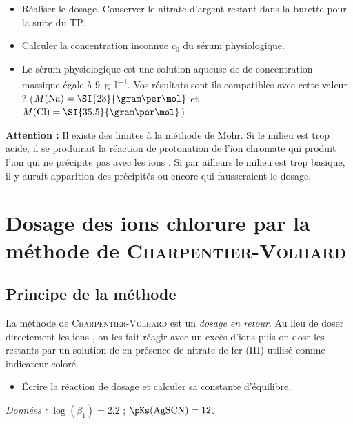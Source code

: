 \documentclass{tp}
\begin{document}
\begin{itemize}
  \item Réaliser le dosage. Conserver le nitrate d'argent restant dans la burette pour la suite du TP. 

  \item Calculer la concentration inconnue $c_0$ du sérum physiologique.

  \item Le sérum physiologique est une solution aqueuse de  de concentration massique égale à \SI{9}{\gram\per\litre}. Vos résultats sont-ils compatibles avec cette valeur ? ($M(\ce{Na})=\SI{23}{\gram\per\mol}$ et $M(\ce{Cl})=\SI{35.5}{\gram\per\mol}$) 
\end{itemize}

\textbf{Attention : } Il existe des limites à la méthode de Mohr. Si le milieu est trop acide, il se produirait la réaction de protonation de l'ion chromate qui produit l'ion  qui ne précipite pas avec les ions . Si par ailleurs le milieu est trop basique, il y aurait apparition des précipités  ou encore  qui fausseraient le dosage.

\section{Dosage des ions chlorure par la méthode de \textsc{Charpentier-Volhard}}%
\label{sec:dosage_des_ions_chlorure_par_la_methode_de_charpentier-volhard}

\subsection{Principe de la méthode}%
\label{sub:principe_de_la_methode}
La méthode de \textsc{Charpentier-Volhard} est un \emph{dosage en retour}. Au lieu de doser directement les ions , on les fait réagir avec un excès d'ions  puis on dose les  restants par un solution de  en présence de nitrate de fer (III) utilisé comme indicateur coloré.

\begin{itemize}
  \item Écrire la réaction de dosage et calculer sa constante d'équilibre.
\end{itemize}

\textit{Données  : } $\log(\beta_1)=\num{2.2}$ ; $\pKs(\ce{AgSCN})=12$.  
\end{document}
